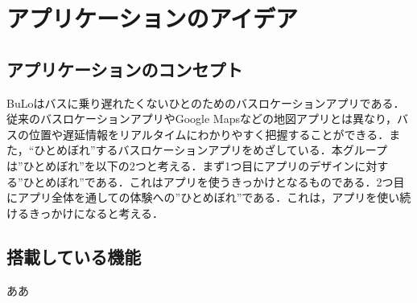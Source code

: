 \chapter{アプリケーションのアイデア}

\section{アプリケーションのコンセプト}
BuLoはバスに乗り遅れたくないひとのためのバスロケーションアプリである．従来のバスロケーションアプリやGoogle Mapsなどの地図アプリとは異なり，バスの位置や遅延情報をリアルタイムにわかりやすく把握することができる．また，“ひとめぼれ”するバスロケーションアプリをめざしている．本グループは”ひとめぼれ”を以下の2つと考える．まず1つ目にアプリのデザインに対する”ひとめぼれ”である．これはアプリを使うきっかけとなるものである．2つ目にアプリ全体を通しての体験への”ひとめぼれ”である．これは，アプリを使い続けるきっかけになると考える．

\section{搭載している機能}
ああ
